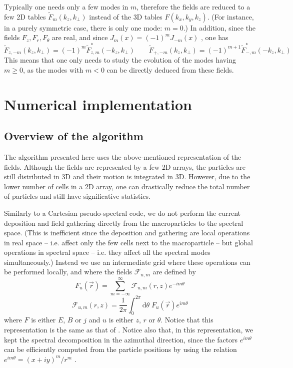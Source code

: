 \documentclass[a4paper]{article}   	%
\newcommand{\TInteg}[1]{\int_{0}^{2\pi} \!\!\!\!\! \mathrm{d}#1}
\begin{document}
Typically one needs only a few modes in $m$, therefore the fields are
reduced to a few 2D tables $\tilde{F}_m(k_z,k_\perp )$ instead of the
3D tables $\hat{F}(k_x,k_y,k_z)$. (For instance, in a purely symmetric
case, there is only one mode: $m=0$.) In addition, since the fields
$F_z, F_r, F_\theta$ are real, and since $J_m(x) =(-1)^mJ_{-m}(x)$ \cite{Abramowitz},
one has
\[ \tilde{F}_{z,-m}(k_z, k_\perp) = (-1)^m\tilde{F}_{z,m}^{*} (-k_z,
k_\perp) \qquad \tilde{F}_{+,-m}(k_z, k_\perp) =
(-1)^{m+1} \tilde{F}_{-,m}^{*} (-k_z, k_\perp) \]
This means that one only needs to study the evolution of the modes having $m\geq 0$, as the modes with $m<0$ can
be directly deduced from these fields.

\section{Numerical implementation}

\subsection{Overview of the algorithm}

The algorithm presented here uses the above-mentioned representation
of the fields. Although the fields are represented by a few
2D arrays, the particles are still distributed in 3D and their motion
is integrated in 3D. However, due to the
lower number of cells in a 2D array, one can drastically reduce the
total number of particles and still have significative statistics.

Similarly to a Cartesian pseudo-spectral code, we do not perform the
current deposition and field gathering directly from the
macroparticles to the spectral space. (This is inefficient since the
deposition and gathering are local operations in real space -- i.e. affect
only the few cells next to the macroparticle -- but global operations
in spectral space -- i.e. they affect all the spectral modes
simultaneously.) Instead we use an intermediate grid where these
operations can be performed locally, and where the fields $\mathcal{F}_{u,m}$
are defined by
\begin{equation} 
\label{eq:IntermBwTrans}
F_u(\vec{r}) = \sum_{m=-\infty}^{\infty} \mathcal{F}_{u,m}(r,z)
e^{-im\theta} 
\end{equation}
\begin{equation}
\label{eq:IntermFwTrans}
\mathcal{F}_{u,m}(r,z) = \frac{1}{2\pi} \TInteg{\theta} \;
F_u(\vec{r})e^{im\theta}
\end{equation}
where ${F}$ is either ${E}$, ${B}$ or
${j}$ and $u$ is either $z$, $r$ or $\theta$. Notice that this representation is the
same as that of \cite{Lifschitz, Davidson}. Notice also that, in this
representation, we kept the spectral decomposition in the azimuthal
direction, since the factors $e^{im\theta}$ can be efficiently computed from the
particle positions by using the relation $e^{im\theta} = (x+iy)^m/r^m$
\cite{Lifschitz}.
\end{document}
